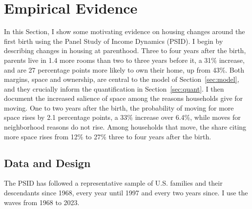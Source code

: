 
\section{Empirical Evidence}
\label{sec:empirical-evidence}

In this Section, I show some motivating evidence on housing changes around
the first birth using the Panel Study of Income Dynamics (PSID). I begin by
describing changes in housing at parenthood. Three to four years after the
birth, parents live in 1.4 more rooms than two to three years before it, a
31\% increase, and are 27 percentage points more likely to own their
home, up from 43\%. Both margins, space and ownership, are central to
the model of Section~\ref{sec:model}, and they crucially inform the
quantification in Section~\ref{sec:quant}. I then document the increased
salience of space among the reasons households give for moving. One to two
years after the birth, the probability of moving for more space rises by 2.1
percentage points, a 33\% increase over 6.4\%, while moves for
neighborhood reasons do not rise. Among households that move, the share
citing more space rises from 12\% to 27\% three to four years after the
birth.

\subsection{Data and Design}
\label{sec:emp-data-design}

The PSID has followed a representative sample of U.S. families and
their descendants since 1968, every year until 1997 and every two years
since. I use the waves from 1968 to 2023.

